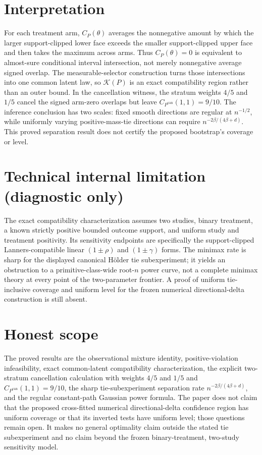 \documentclass{article}
\begin{document}
\section{Interpretation}

For each treatment arm, \(C_P(\theta)\) averages the nonnegative amount by which the larger support-clipped lower face exceeds the smaller support-clipped upper face and then takes the maximum across arms. Thus \(C_P(\theta)=0\) is equivalent to almost-sure conditional interval intersection, not merely nonnegative average signed overlap. The measurable-selector construction turns those intersections into one common latent law, so \(\mathcal K(P)\) is an exact compatibility region rather than an outer bound. In the cancellation witness, the stratum weights \(4/5\) and \(1/5\) cancel the signed arm-zero overlaps but leave \(C_{P^{\mathrm{can}}}(1,1)=9/10\). The inference conclusion has two scales: fixed smooth directions are regular at \(n^{-1/2}\), while uniformly varying positive-mass-tie directions can require \(n^{-2\beta/(4\beta+d)}\). This proved separation result does not certify the proposed bootstrap's coverage or level.

\section*{Technical internal limitation (diagnostic only)}

The exact compatibility characterization assumes two studies, binary treatment, a known strictly positive bounded outcome support, and uniform study and treatment positivity. Its sensitivity endpoints are specifically the support-clipped Lanners-compatible linear \((1\pm\rho)\) and \((1\pm\gamma)\) forms. The minimax rate is sharp for the displayed canonical Hölder tie subexperiment; it yields an obstruction to a primitive-class-wide root-\(n\) power curve, not a complete minimax theory at every point of the two-parameter frontier. A proof of uniform tie-inclusive coverage and uniform level for the frozen numerical directional-delta construction is still absent.

\section{Honest scope}

The proved results are the observational mixture identity, positive-violation infeasibility, exact common-latent compatibility characterization, the explicit two-stratum cancellation calculation with weights \(4/5\) and \(1/5\) and \(C_{P^{\mathrm{can}}}(1,1)=9/10\), the sharp tie-subexperiment separation rate \(n^{-2\beta/(4\beta+d)}\), and the regular constant-path Gaussian power formula. The paper does not claim that the proposed cross-fitted numerical directional-delta confidence region has uniform coverage or that its inverted tests have uniform level; those questions remain open. It makes no general optimality claim outside the stated tie subexperiment and no claim beyond the frozen binary-treatment, two-study sensitivity model.
\end{document}

